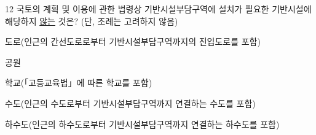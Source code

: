\begin{question}{12}
국토의 계획 및 이용에 관한 법령상 기반시설부담구역에 설치가 필요한 기반시설에 해당하지 \uline{않는} 것은? (단, 조례는 고려하지 않음)
\begin{choices}
  \item 도로(인근의 간선도로로부터 기반시설부담구역까지의 진입도로를 포함)
  \item 공원
  \item 학교(「고등교육법」에 따른 학교를 포함)
  \item 수도(인근의 수도로부터 기반시설부담구역까지 연결하는 수도를 포함)
  \item 하수도(인근의 하수도로부터 기반시설부담구역까지 연결하는 하수도를 포함)
\end{choices}
\end{question}
